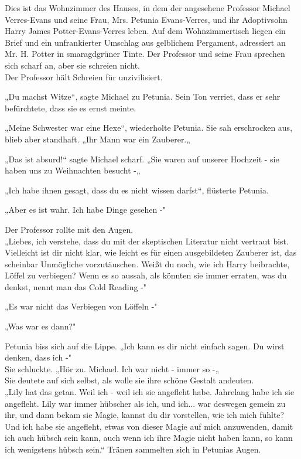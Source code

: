 {Dies ist das Wohnzimmer des Hauses, in dem der angesehene Professor Michael Verres-Evans und seine Frau, Mrs. Petunia Evans-Verres, und ihr Adoptivsohn Harry James Potter-Evans-Verres leben. Auf dem Wohnzimmertisch liegen ein Brief und ein unfrankierter Umschlag aus gelblichem Pergament, adressiert an Mr. H. Potter in smaragdgrüner Tinte. Der Professor und seine Frau sprechen sich scharf an, aber sie schreien nicht.\\ Der Professor hält Schreien für unzivilisiert.

„Du machst Witze“, sagte Michael zu Petunia. Sein Ton verriet, dass er sehr befürchtete, dass sie es ernst meinte.

„Meine Schwester war eine Hexe“, wiederholte Petunia. Sie sah erschrocken aus, blieb aber standhaft. „Ihr Mann war ein Zauberer.„

„Das ist absurd!“ sagte Michael scharf. „Sie waren auf unserer Hochzeit - sie haben uns zu Weihnachten besucht -„

„Ich habe ihnen gesagt, dass du es nicht wissen darfst“, flüsterte Petunia.

„Aber es ist wahr. Ich habe Dinge gesehen -"

Der Professor rollte mit den Augen.\\ „Liebes, ich verstehe, dass du mit der skeptischen Literatur nicht vertraut bist.\\ Vielleicht ist dir nicht klar, wie leicht es für einen ausgebildeten Zauberer ist, das scheinbar Unmögliche vorzutäuschen. Weißt du noch, wie ich Harry beibrachte, Löffel zu verbiegen? Wenn es so aussah, als könnten sie immer erraten, was du denkst, nennt man das Cold Reading -"

„Es war nicht das Verbiegen von Löffeln -"

„Was war es dann?"

Petunia biss sich auf die Lippe. „Ich kann es dir nicht einfach sagen. Du wirst denken, dass ich -"\\ Sie schluckte. „Hör zu. Michael. Ich war nicht - immer so -„\\ Sie deutete auf sich selbst, als wolle sie ihre schöne Gestalt andeuten.\\ „Lily hat das getan. Weil ich - weil ich sie angefleht habe. Jahrelang habe ich sie angefleht. Lily war immer hübscher als ich, und ich... war deswegen gemein zu ihr, und dann bekam sie Magie, kannst du dir vorstellen, wie ich mich fühlte? Und ich habe sie angefleht, etwas von dieser Magie auf mich anzuwenden, damit ich auch hübsch sein kann, auch wenn ich ihre Magie nicht haben kann, so kann ich wenigstens hübsch sein.“ Tränen sammelten sich in Petunias Augen.

}
